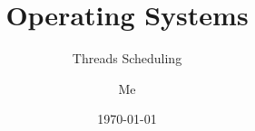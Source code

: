 \documentclass[12pt]{beamer}
\title{Operating Systems}
\subtitle{Threads Scheduling}
\author{Me}
\date{\today}
\begin{document}
  \begin{frame}
    \titlepage
  \end{frame}

  

%    
\end{document}
